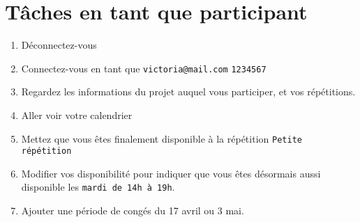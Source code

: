 \documentclass[11pt]{article}
\begin{document}
\section{Tâches en tant que participant}
\begin{enumerate}
    \item Déconnectez-vous
    \item Connectez-vous en tant que \texttt{victoria@mail.com} \texttt{1234567}
    \item Regardez les informations du projet auquel vous participer, et vos répétitions.
    \item Aller voir votre calendrier
    \item Mettez que vous êtes finalement disponible à la répétition \texttt{Petite répétition}
    \item Modifier vos disponibilité pour indiquer que vous êtes désormais aussi disponible les \texttt{mardi de 14h à 19h}.
    \item Ajouter une période de congés du 17 avril ou 3 mai.
\end{enumerate}
\end{document}
